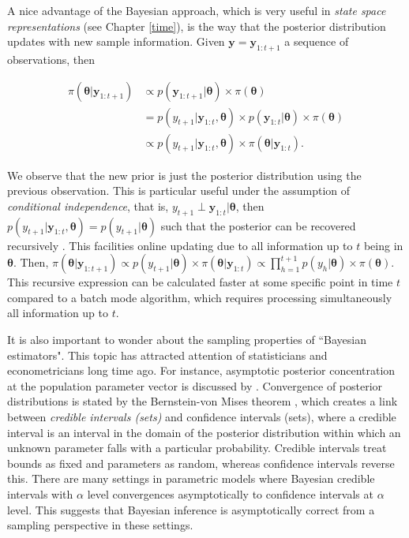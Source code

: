 A nice advantage of the Bayesian approach, which is very useful in \textit{state space representations} (see Chapter \ref{time}), is the way that the posterior distribution updates with new sample information. Given $\mathbf{y}=\mathbf{y}_{1:t+1}$ a sequence of observations, then

\begin{align}
	\pi(\mathbf{\theta}|\mathbf{y}_{1:t+1})&\propto p(\mathbf{y}_{1:t+1}|\mathbf{\theta})\times \pi(\mathbf{\theta})\nonumber\\
	&= p(y_{t+1}|\mathbf{y}_{1:t},\mathbf{\theta})\times p(\mathbf{y}_{1:t}|\mathbf{\theta})\times \pi(\mathbf{\theta})\nonumber\\
	&\propto p(y_{t+1}|\mathbf{y}_{1:t},\mathbf{\theta})\times \pi(\mathbf{\theta}|\mathbf{y}_{1:t}). 
\end{align}

We observe that the new prior is just the posterior distribution using the previous observation. This is particular useful under the assumption of \textit{conditional independence}, that is, $y_{t+1}\perp\mathbf{y}_{1:t}|\mathbf{\theta}$, then $p(y_{t+1}|\mathbf{y}_{1:t},\mathbf{\theta})=p(y_{t+1}|\mathbf{\theta})$ such that the posterior can be recovered recursively \cite{petris2009dynamic}. This facilities online updating due to all information up to $t$ being in $\mathbf{\theta}$. Then, $\pi(\mathbf{\theta}|\mathbf{y}_{1:t+1})\propto p(y_{t+1}|\mathbf{\theta})\times \pi(\mathbf{\theta}|\mathbf{y}_{1:t})\propto\prod_{h=1}^{t+1} p(y_h|\mathbf{\theta})\times \pi(\mathbf{\theta})$. This recursive expression can be calculated faster at some specific point in time $t$ compared to a batch mode algorithm, which requires processing simultaneously all information up to $t$.

It is also important to wonder about the sampling properties of ``Bayesian estimators". This topic has attracted attention of statisticians and econometricians long time ago. For instance, asymptotic posterior concentration at the population parameter vector is discussed by \cite{bickel1969some}. Convergence of posterior distributions is stated by the Bernstein-von Mises theorem \cite{Lehmann2003}, which creates a link between \textit{credible intervals (sets)} and confidence intervals (sets), where a credible interval is an interval in the domain of the posterior distribution within which an unknown parameter falls with a particular probability. Credible intervals treat bounds as fixed and parameters as random, whereas confidence intervals reverse this. There are many settings in parametric models where Bayesian credible intervals with $\alpha$ level convergences asymptotically to confidence intervals at $\alpha$ level. This suggests that Bayesian inference is asymptotically correct from a sampling perspective in these settings.

